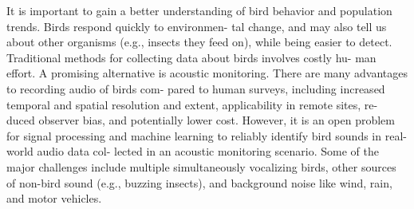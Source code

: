 \cite{BriggsMLSP13} It is important to gain a better understanding of bird behavior
and population trends. Birds respond quickly to environmen-
tal change, and may also tell us about other organisms (e.g.,
insects they feed on), while being easier to detect. Traditional
methods for collecting data about birds involves costly hu-
man effort. A promising alternative is acoustic monitoring.
There are many advantages to recording audio of birds com-
pared to human surveys, including increased temporal and
spatial resolution and extent, applicability in remote sites, re-
duced observer bias, and potentially lower cost. However, it is
an open problem for signal processing and machine learning
to reliably identify bird sounds in real-world audio data col-
lected in an acoustic monitoring scenario. Some of the major
challenges include multiple simultaneously vocalizing birds,
other sources of non-bird sound (e.g., buzzing insects), and
background noise like wind, rain, and motor vehicles.
